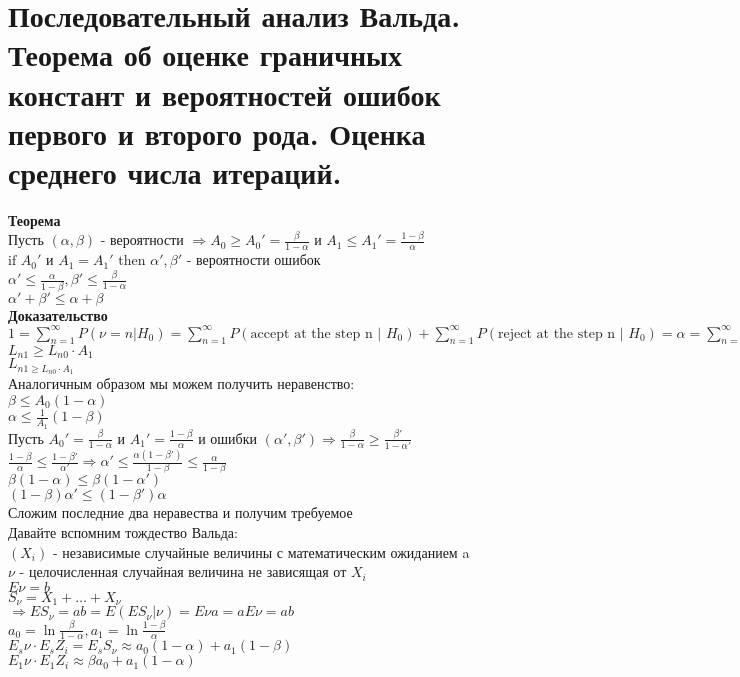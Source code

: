 \documentclass{article}
\newcommand\0{\mathbb{0}}
\newcommand\1{\mathbb{1}}
\renewcommand{\bf}{\textbf}
\newcommand{\Rto}{\Rightarrow}
\begin{document}
\section{Последовательный анализ Вальда. Теорема об оценке граничных констант и вероятностей
ошибок первого и второго рода. Оценка среднего числа итераций.}
\bf{Теорема}\\
Пусть $(\alpha, \beta)$ - вероятности $\Rto A_0 \geq A_0' = \frac{\beta}{1 - \alpha}$ и $A_1 \leq A_1' = \frac{1 - \beta}{\alpha}$\\
$\text{if } A_0'$ и $A_1 = A_1' \text{ then } \alpha', \beta'$ - вероятности ошибок\\
$\alpha' \leq \frac{\alpha}{1 - \beta}, \beta' \leq \frac{\beta}{1 - \alpha}$\\
$\alpha' + \beta' \leq \alpha + \beta$\\
\bf{Доказательство}\\
$1 = \displaystyle\sum_{n = 1}^{\infty}P(\nu = n | H_0) = \displaystyle\sum_{n = 1}^{\infty}P(\text{accept at the step n | }H_0) + \displaystyle\sum_{n = 1}^{\infty}P(\text{reject at the step n | }H_0) = \alpha = \displaystyle\sum_{n = 1}^{\infty}P(\text{reject at the step n |}H_0) \leq \frac{1}{A_1}\displaystyle\sum_{n = 1}^{\infty}P(\text{reject at the step n | }H_1)$\\
$L_{n1} \geq L_{n0} \cdot A_1$\\
$L_{n1 \geq L_{n0} \cdot A_1}$\\
Аналогичным образом мы можем получить неравенство:\\
$\beta \leq A_0(1 - \alpha)$\\
$\alpha \leq \frac{1}{A_1}(1 - \beta)$\\
Пусть $A_0' = \frac{\beta}{1 - \alpha}$ и $A_1' = \frac{1 - \beta}{\alpha}$ и ошибки $(\alpha', \beta') \Rto \frac{\beta}{1 - \alpha} \geq \frac{\beta'}{1 - \alpha'}$\\
$\frac{1 - \beta}{\alpha} \leq \frac{1 - \beta'}{\alpha'} \Rto \alpha' \leq \frac{\alpha(1 - \beta')}{1 - \beta} \leq \frac{\alpha}{1 - \beta}$\\
$\beta(1 - \alpha) \leq \beta(1 - \alpha')$\\
$(1 - \beta)\alpha' \leq (1 - \beta')\alpha$\\
Сложим последние два неравества и получим требуемое\\
Давайте вспомним тождество Вальда:\\
$(X_i)$ - независимые случайные величины с математическим ожиданием a\\
$\nu$ - целочисленная случайная величина не зависящая от $X_i$\\
$E\nu = b$\\
$S_\nu = X_1 + \dots + X_\nu$\\
$\Rto ES_\nu = ab = E(ES_\nu | \nu) = E\nu a = aE\nu = ab$\\
$a_0 = \ln{\frac{\beta}{1 - \alpha}}, a_1 = \ln{\frac{1 - \beta}{\alpha}}$\\
$E_s\nu \cdot E_sZ_i = E_sS_\nu \approx a_0(1 - \alpha) + a_1(1 - \beta)$\\
$E_1\nu \cdot E_1Z_i \approx \beta a_0 + a_1(1 - \alpha)$
\end{document}
